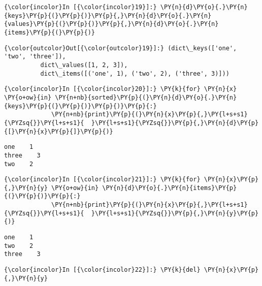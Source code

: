     \begin{Verbatim}[commandchars=\\\{\}]
{\color{incolor}In [{\color{incolor}19}]:} \PY{n}{d}\PY{o}{.}\PY{n}{keys}\PY{p}{(}\PY{p}{)}\PY{p}{,}\PY{n}{d}\PY{o}{.}\PY{n}{values}\PY{p}{(}\PY{p}{)}\PY{p}{,}\PY{n}{d}\PY{o}{.}\PY{n}{items}\PY{p}{(}\PY{p}{)}
\end{Verbatim}

            \begin{Verbatim}[commandchars=\\\{\}]
{\color{outcolor}Out[{\color{outcolor}19}]:} (dict\_keys(['one', 'two', 'three']),
          dict\_values([1, 2, 3]),
          dict\_items([('one', 1), ('two', 2), ('three', 3)]))
\end{Verbatim}
        
    \begin{Verbatim}[commandchars=\\\{\}]
{\color{incolor}In [{\color{incolor}20}]:} \PY{k}{for} \PY{n}{x} \PY{o+ow}{in} \PY{n+nb}{sorted}\PY{p}{(}\PY{n}{d}\PY{o}{.}\PY{n}{keys}\PY{p}{(}\PY{p}{)}\PY{p}{)}\PY{p}{:}
             \PY{n+nb}{print}\PY{p}{(}\PY{n}{x}\PY{p}{,}\PY{l+s+s1}{\PYZsq{}}\PY{l+s+s1}{  }\PY{l+s+s1}{\PYZsq{}}\PY{p}{,}\PY{n}{d}\PY{p}{[}\PY{n}{x}\PY{p}{]}\PY{p}{)}
\end{Verbatim}

    \begin{Verbatim}[commandchars=\\\{\}]
one    1
three    3
two    2

    \end{Verbatim}

    \begin{Verbatim}[commandchars=\\\{\}]
{\color{incolor}In [{\color{incolor}21}]:} \PY{k}{for} \PY{n}{x}\PY{p}{,}\PY{n}{y} \PY{o+ow}{in} \PY{n}{d}\PY{o}{.}\PY{n}{items}\PY{p}{(}\PY{p}{)}\PY{p}{:}
             \PY{n+nb}{print}\PY{p}{(}\PY{n}{x}\PY{p}{,}\PY{l+s+s1}{\PYZsq{}}\PY{l+s+s1}{  }\PY{l+s+s1}{\PYZsq{}}\PY{p}{,}\PY{n}{y}\PY{p}{)}
\end{Verbatim}

    \begin{Verbatim}[commandchars=\\\{\}]
one    1
two    2
three    3

    \end{Verbatim}

    \begin{Verbatim}[commandchars=\\\{\}]
{\color{incolor}In [{\color{incolor}22}]:} \PY{k}{del} \PY{n}{x}\PY{p}{,}\PY{n}{y}
\end{Verbatim}

